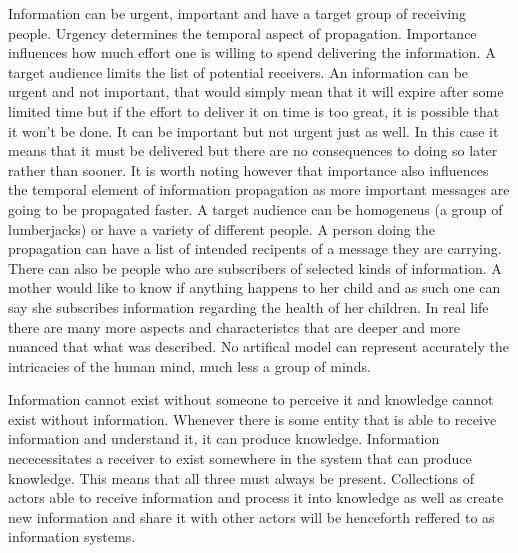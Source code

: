Information can be urgent, important and have a target group of receiving people.
Urgency determines the temporal aspect of propagation.
Importance influences how much effort one is willing to spend delivering the information.
A target audience limits the list of potential receivers.
An information can be urgent and not important, that would simply mean that it will expire after some limited time but if the effort to deliver it on time is too great, it is possible that it won't be done.
It can be important but not urgent just as well.
In this case it means that it must be delivered but there are no consequences to doing so later rather than sooner.
It is worth noting however that importance also influences the temporal element of information propagation as more important messages are going to be propagated faster.
A target audience can be homogeneus (a group of lumberjacks) or have a variety of different people.
A person doing the propagation can have a list of intended recipents of a message they are carrying.
There can also be people who are subscribers of selected kinds of information.
A mother would like to know if anything happens to her child and as such one can say she subscribes information regarding the health of her children.
In real life there are many more aspects and characteristcs that are deeper and more nuanced that what was described.
No artifical model can represent accurately the intricacies of the human mind, much less a group of minds.

Information cannot exist without someone to perceive it and knowledge cannot exist without information.
Whenever there is some entity that is able to receive information and understand it, it can produce knowledge.
Information nececessitates a receiver to exist somewhere in the system that can produce knowledge.
This means that all three must always be present.
Collections of actors able to receive information and process it into knowledge as well as create new information and share it with other actors will be henceforth reffered to as information systems.

